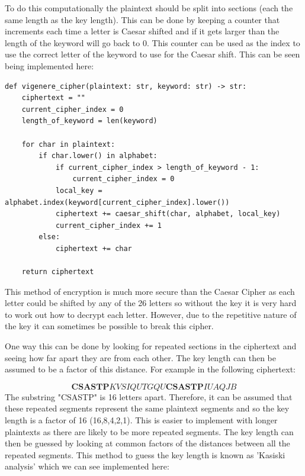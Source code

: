 \documentclass{article}
\begin{document}
To do this computationally the plaintext should be split into sections (each
the same length as the key length). This can be done by keeping a counter that
increments each time a letter is Caesar shifted and if it gets larger than the
length of the keyword will go back to 0. This counter can be used as the index
to use the correct letter of the keyword to use for the Caesar shift. This can
be seen being implemented here:\medskip

\begin{lstlisting}
def vigenere_cipher(plaintext: str, keyword: str) -> str:
    ciphertext = ""
    current_cipher_index = 0
    length_of_keyword = len(keyword)

    for char in plaintext:
        if char.lower() in alphabet:
            if current_cipher_index > length_of_keyword - 1:
                current_cipher_index = 0
            local_key = alphabet.index(keyword[current_cipher_index].lower())
            ciphertext += caesar_shift(char, alphabet, local_key)
            current_cipher_index += 1
        else:
            ciphertext += char

    return ciphertext
\end{lstlisting}
\medskip
This method of encryption is much more secure than the Caesar Cipher as each
letter could be shifted by any of the 26 letters so without the key it is very
hard to work out how to decrypt each letter. However, due to the repetitive
nature of the key it can sometimes be possible to break this cipher.\medskip

One way this can be done by looking for repeated sections in the ciphertext and
seeing how far apart they are from each other. The key length can then be
assumed to be a factor of this distance. For example in the following
ciphertext:
\medskip

\[\bm{CSASTP}KVSIQUTGQU\bm{CSASTP}IUAQJB\]
\medskip
The substring "CSASTP" is 16 letters apart. Therefore, it can be assumed that
these repeated segments represent the same plaintext segments and so the key
length is a factor of 16 (16,8,4,2,1). This is easier to implement with longer
plaintexts as there are likely to be more repeated segments. The key length can
then be guessed by looking at common factors of the distances between all the
repeated segments. This method to guess the key length is known as 'Kasiski
analysis' \cite{kasiski} which we can see implemented here:
\medskip
\end{document}
